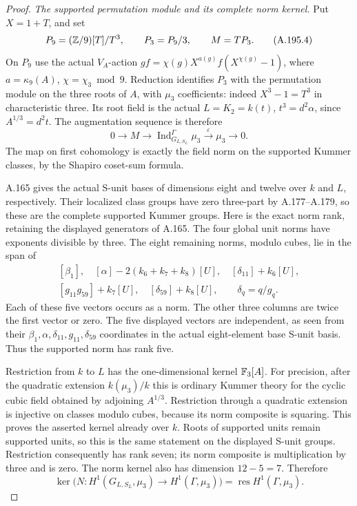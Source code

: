 \begin{proof}
\emph{The supported permutation module and its complete norm kernel.}
Put \(X=1+T\), and set
\[
 P_9=(\mathbb Z/9)[T]/T^3,
 \qquad P_3=P_9/3,
 \qquad M=TP_3.
\tag{A.195.4}
\]
On \(P_9\) use the actual \(V_A\)-action
\(g f=\chi(g)X^{a(g)}f(X^{\chi(g)}-1)\), where
\(a=\kappa_9(A)\), \(\chi=\chi_3\bmod9\).
Reduction identifies \(P_3\) with the permutation module
on the three roots of \(A\), with \(\mu_3\) coefficients:
indeed \(X^3-1=T^3\) in characteristic three.
Its root field is the actual \(L=K_2=k(t)\),
\(t^3=d^2\alpha\), since \(A^{1/3}=d^2t\).
The augmentation sequence is therefore
\[
 0\longrightarrow M\longrightarrow
       \operatorname{Ind}_{G_{L,S_L}}^{\Gamma}\mu_3
       \xrightarrow{\ \varepsilon\ }\mu_3\longrightarrow0.
\tag{A.195.5}
\]
The map on first cohomology is exactly the field norm on
the supported Kummer classes, by the Shapiro coset-sum formula.

A.165 gives the actual S-unit bases of dimensions eight and
twelve over \(k\) and \(L\), respectively.  Their localized
class groups have zero three-part by A.177--A.179, so these
are the complete supported Kummer groups.  Here is the
exact norm rank, retaining the displayed generators of A.165.
The four global unit norms have exponents divisible by three.
The eight remaining norms, modulo cubes, lie in the span of
\[
 \begin{gathered}
 [\beta_1],\quad
 [\alpha]-2(k_6+k_7+k_8)[U],\quad
 [\delta_{11}]+k_6[U],\\
 [g_{11}g_{59}]+k_7[U],\quad
 [\delta_{59}]+k_8[U],
 \qquad\delta_q=q/g_q.
 \end{gathered}
\tag{A.195.6}
\]
Each of these five vectors occurs as a norm.  The other
three columns are twice the first vector or zero.  The
five displayed vectors are independent, as seen from their
\(\beta_1,\alpha,\delta_{11},g_{11},\delta_{59}\)
coordinates in the actual eight-element base S-unit basis.
Thus the supported norm has rank five.

Restriction from \(k\) to \(L\) has the one-dimensional
kernel \(\mathbb F_3[A]\).  For precision, after the quadratic
extension \(k(\mu_3)/k\) this is ordinary Kummer theory
for the cyclic cubic field obtained by adjoining \(A^{1/3}\).
Restriction through a quadratic extension is injective on
classes modulo cubes, because its norm composite is squaring.
This proves the asserted kernel already over \(k\).
Roots of supported units remain supported units, so this
is the same statement on the displayed S-unit groups.
Restriction consequently has rank seven; its norm composite
is multiplication by three and is zero.  The norm kernel
also has dimension \(12-5=7\).  Therefore
\[
 \ker\bigl(N:H^1(G_{L,S_L},\mu_3)
                    \to H^1(\Gamma,\mu_3)\bigr)
       =\operatorname{res}H^1(\Gamma,\mu_3).
\tag{A.195.7}
\]


\end{proof}
